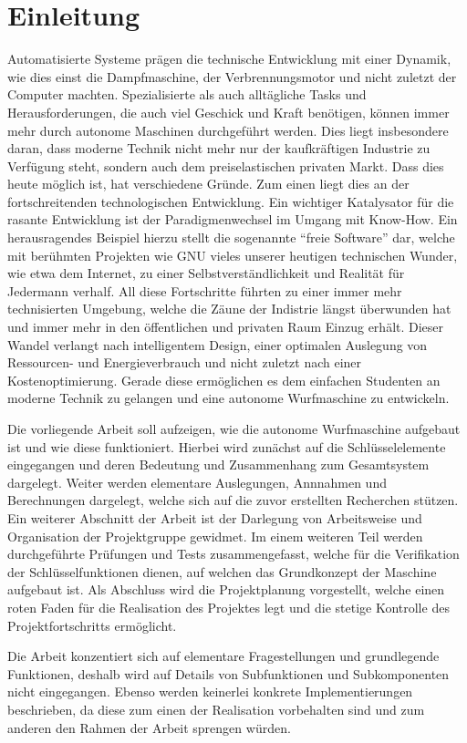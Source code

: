 \section{Einleitung}
Automatisierte Systeme prägen die technische Entwicklung mit einer Dynamik,
wie dies einst die Dampfmaschine, der Verbrennungsmotor und nicht zuletzt der
Computer machten. Spezialisierte als auch alltägliche Tasks und 
Herausforderungen, die auch viel Geschick und Kraft benötigen, können immer
mehr durch autonome Maschinen durchgeführt werden. Dies liegt insbesondere
daran, dass moderne Technik nicht mehr nur der kaufkräftigen Industrie zu
Verfügung steht, sondern auch dem preiselastischen privaten Markt. Dass dies
heute möglich ist, hat verschiedene Gründe. Zum einen liegt dies an der
fortschreitenden technologischen Entwicklung. Ein wichtiger Katalysator für
die rasante Entwicklung ist der Paradigmenwechsel im Umgang mit Know-How.
Ein herausragendes Beispiel hierzu stellt die sogenannte 
``freie Software'' dar, welche mit berühmten Projekten wie GNU vieles
unserer heutigen technischen Wunder, wie etwa dem Internet, zu einer
Selbstverständlichkeit und Realität für Jedermann verhalf.
All diese Fortschritte führten zu einer immer mehr technisierten
Umgebung, welche die Zäune der Indistrie längst überwunden hat und immer
mehr in den öffentlichen und privaten Raum Einzug erhält. Dieser Wandel
verlangt nach intelligentem Design, einer optimalen Auslegung von
Ressourcen- und Energieverbrauch und nicht zuletzt nach einer
Kostenoptimierung. Gerade diese ermöglichen es dem einfachen Studenten an
moderne Technik zu gelangen und eine autonome Wurfmaschine zu
entwickeln. 

Die vorliegende Arbeit soll aufzeigen, wie die autonome Wurfmaschine
aufgebaut ist und wie diese funktioniert. Hierbei wird zunächst auf die
Schlüsselelemente eingegangen und deren Bedeutung und Zusammenhang
zum Gesamtsystem dargelegt. Weiter werden elementare Auslegungen, Annnahmen
und Berechnungen dargelegt, welche sich auf die zuvor erstellten Recherchen
stützen. Ein weiterer Abschnitt der Arbeit ist der Darlegung von Arbeitsweise
und Organisation der Projektgruppe gewidmet. Im einem weiteren Teil werden
durchgeführte Prüfungen und Tests zusammengefasst, welche für die Verifikation
der Schlüsselfunktionen dienen, auf welchen das Grundkonzept der Maschine
aufgebaut ist. Als Abschluss wird die Projektplanung vorgestellt, welche
einen roten Faden für die Realisation des Projektes legt und die stetige
Kontrolle des Projektfortschritts ermöglicht.

Die Arbeit konzentiert sich auf elementare Fragestellungen und grundlegende
Funktionen, deshalb wird auf Details von Subfunktionen und Subkomponenten
nicht eingegangen. Ebenso werden keinerlei konkrete Implementierungen 
beschrieben, da diese zum einen der Realisation vorbehalten sind und zum
anderen den Rahmen der Arbeit sprengen würden.
